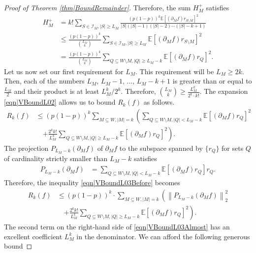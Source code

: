 \documentclass[reqno]{amsart}
\begin{document}
\begin{proof}[Proof of Theorem \ref{thm|BoundRemainder}]
Therefore, the sum $H_M^+$ satisfies
\begin{align*}
\nonumber H_M^+&=k!  \sum_{S\in\mathcal I_M, |S|\geq L_M}\frac{(p(1-p))^{k}\mathbb E\left[\left(\partial_Mf\right)r_{S\setminus M}\right]^2}{|S|(|S|-1)(|S|-2)\cdots (|S|-k+1)}\\
\nonumber
&\leq\frac{(p(1-p))^k}{\binom{L_M}{k}} \sum_{S\in\mathcal I_M, |S|\geq L_M}
\mathbb E\left[\left(\partial_Mf\right)r_{S\setminus M}\right]^2 \\
\nonumber
&=\frac{(p(1-p))^k}{\binom{L_M}{k}}\sum_{Q\subseteq W\setminus M, |Q|\geq L_M-k} 
\mathbb E\left[\left(\partial_Mf\right)r_{Q}\right]^2.
\end{align*}
Let us now set our first requirement for $L_M$. This requirement will be $L_M\geq 2k$. Then, each of the numbers $L_M$, $L_M-1$, $\dots$, $L_M-k+1$ is greater than or equal to $\frac{L_M}2$ and their product is at 
least $L_M^k/2^k$. Therefore,  $\binom{L_M}{k}\geq \frac{L_M^k}{2^k\cdot k!}$. The expansion \eqref{eqn|VBoundL02} allows us to bound $R_k(f)$ as follows.
\begin{align}\nonumber
R_k(f)&\leq
(p(1-p))^k\sum_{M\subseteq W, |M|=k} \left(
 \sum_{Q\subseteq W\setminus M, |Q|<L_M-k}\mathbb E\left[\left(\partial_Mf\right)r_Q\right]^2\right.\\
  &\quad\left.
+
\frac{2^kk!}{L_M^k}\sum_{Q\subseteq W\setminus M, |Q|\geq L_M-k}\mathbb E\left[\left(\partial_Mf\right)r_Q\right]^2
\right). \label{eqn|VBoundL03Before}
\end{align}
The projection $P_{L_M-k}(\partial_Mf)$ of $\partial_Mf$ to the subspace spanned by $\{r_Q\}$ for sets $Q$ of cardinality strictly smaller than $L_M-k$ satisfies 
\begin{align*}
P_{L_M-k}(\partial_Mf)&=\sum_{Q\subseteq W\setminus M,|Q|<L_M-k} \mathbb E\left[\left(\partial_Mf\right)r_Q\right]r_Q.
\end{align*}
Therefore, the inequality \eqref{eqn|VBoundL03Before} becomes 
\begin{align}\nonumber 
R_k(f)&\leq (p(1-p))^k\cdot\sum_{M\subseteq W, |M|=k} \left(
  \left\|P_{L_M-k}(\partial_Mf)\right\|_2^2\right.\\
  &\quad\left.
+
\frac{2^kk!}{L_M^k}\sum_{Q\subseteq W\setminus M, |Q|\geq L_M-k}\mathbb E\left[\left(\partial_Mf\right)r_Q\right]^2
\right). \label{eqn|VBoundL03Almost}
\end{align}
The second term on the right-hand side of \eqref{eqn|VBoundL03Almost} has an excellent coefficient $L_M^k$ in the denominator. We can afford the following generous bound 

\end{proof}
\end{document}
